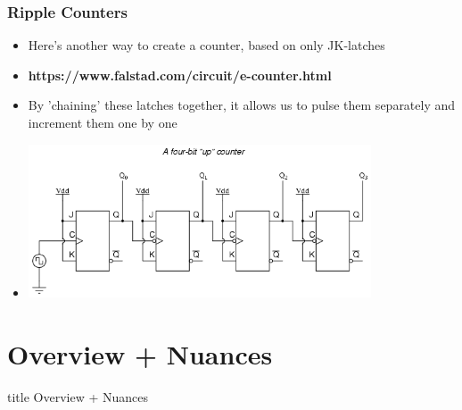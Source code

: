 \documentclass{beamer}
\begin{document}
		\begin{frame}
			\frametitle{Ripple Counters}
			\begin{itemize}
				\item Here's another way to create a counter, based on only JK-latches
				\item \textbf{https://www.falstad.com/circuit/e-counter.html}
				\item By 'chaining' these latches together, it allows us to pulse them separately and increment them one by one
				\item \includegraphics[width=0.8\textwidth]{ripplectr}
				
			\end{itemize}
			
		\end{frame}
		
	\section{Overview + Nuances}
		
		\begin{frame}
                \vfill
                \centering
                \begin{beamercolorbox}[sep=8pt,center,shadow=true,rounded=true]{title}
                    Overview + Nuances\par%
                \end{beamercolorbox}
                \vfill
             \end{frame}
             
\end{document}
